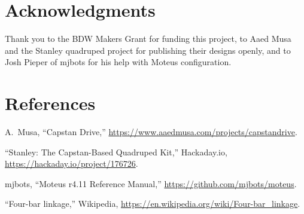 \documentclass[11pt]{article}
\begin{document}
\section*{Acknowledgments}

Thank you to the BDW Makers Grant for funding this project, to Aaed Musa and the
Stanley quadruped project for publishing their designs openly, and to Josh
Pieper of mjbots for his help with Moteus configuration.

\section*{References}
\begin{enumerate}[label={[\arabic*]}]
  \item A.~Musa, ``Capstan Drive,''
        \url{https://www.aaedmusa.com/projects/capstandrive}.
  \item ``Stanley: The Capstan-Based Quadruped Kit,'' Hackaday.io,
        \url{https://hackaday.io/project/176726}.
  \item mjbots, ``Moteus r4.11 Reference Manual,''
        \url{https://github.com/mjbots/moteus}.
  \item ``Four-bar linkage,'' Wikipedia,
        \url{https://en.wikipedia.org/wiki/Four-bar_linkage}.
\end{enumerate}
\end{document}
